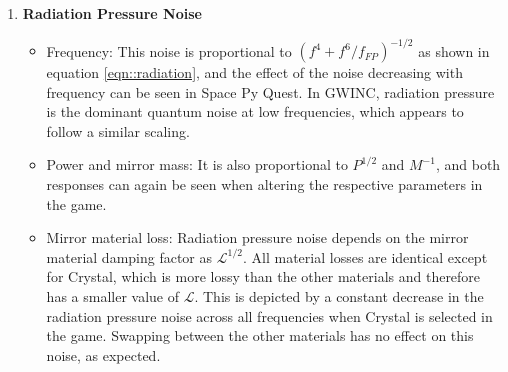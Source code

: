 \documentclass{article}
\begin{document}
\begin{enumerate}
    \item \textbf{Radiation Pressure Noise}
    \begin{itemize}
    \item Frequency: This noise is proportional to
      $(f^4+f^6/f_{FP})^{-1/2}$ as shown in equation
      \ref{eqn::radiation}, and the effect of the noise decreasing
      with frequency can be seen in Space Py Quest. In GWINC,
      radiation pressure is the dominant quantum noise at low
      frequencies, which appears to follow a similar scaling.  
\item Power and mirror mass: It is also proportional to $P^{1/2}$ and
  $M^{-1}$, and both responses can again be seen when altering the
  respective parameters in the game.
\item Mirror material loss: Radiation pressure noise depends on the
  mirror material damping factor as $\mathcal{L}^{1/2}$. All material
  losses are identical except for Crystal, which is more lossy than
  the other materials and therefore has a smaller value of
  $\mathcal{L}$. This is depicted by a constant decrease in the
  radiation pressure noise across all frequencies when Crystal is
  selected in the game. Swapping between the other materials has no
  effect on this noise, as expected.
\end{itemize}
    

\end{enumerate}
\end{document}
